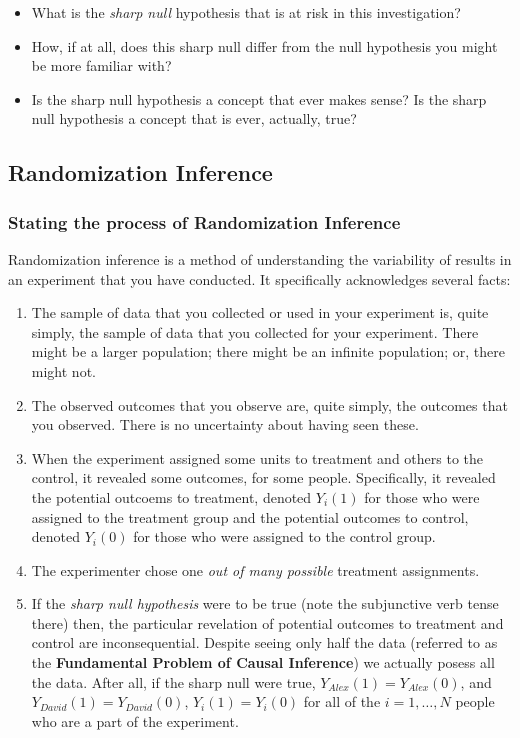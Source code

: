 \documentclass[
]{article}
\providecommand{\tightlist}{%
  \setlength{\itemsep}{0pt}\setlength{\parskip}{0pt}}
\theoremstyle{definition}
\theoremstyle{definition}
\theoremstyle{definition}
\theoremstyle{definition}
\theoremstyle{remark}
\begin{document}
\begin{itemize}
\tightlist
\item
  What is the \emph{sharp null} hypothesis that is at risk in this investigation?
\item
  How, if at all, does this sharp null differ from the null hypothesis you might be more familiar with?
\item
  Is the sharp null hypothesis a concept that ever makes sense? Is the sharp null hypothesis a concept that is ever, actually, true?
\end{itemize}

\subsection{Randomization Inference}\label{randomization-inference}

\subsubsection{Stating the process of Randomization Inference}\label{stating-the-process-of-randomization-inference}

Randomization inference is a method of understanding the variability of results in an experiment that you have conducted. It specifically acknowledges several facts:

\begin{enumerate}
\def\labelenumi{\arabic{enumi}.}
\tightlist
\item
  The sample of data that you collected or used in your experiment is, quite simply, the sample of data that you collected for your experiment. There might be a larger population; there might be an infinite population; or, there might not.
\item
  The observed outcomes that you observe are, quite simply, the outcomes that you observed. There is no uncertainty about having seen these.
\item
  When the experiment assigned some units to treatment and others to the control, it revealed some outcomes, for some people. Specifically, it revealed the potential outcoems to treatment, denoted \(Y_{i}(1)\) for those who were assigned to the treatment group and the potential outcomes to control, denoted \(Y_{i}(0)\) for those who were assigned to the control group.
\item
  The experimenter chose one \emph{out of many possible} treatment assignments.
\item
  If the \emph{sharp null hypothesis} were to be true (note the subjunctive verb tense there) then, the particular revelation of potential outcomes to treatment and control are inconsequential. Despite seeing only half the data (referred to as the \textbf{Fundamental Problem of Causal Inference}) we actually posess all the data. After all, if the sharp null were true, \(Y_{Alex}(1) = Y_{Alex}(0)\), and \(Y_{David}(1) = Y_{David}(0)\), \(Y_{i}(1) = Y_{i}(0)\) for all of the \(i = {1, \dots, N}\) people who are a part of the experiment.
\end{enumerate}
\end{document}
